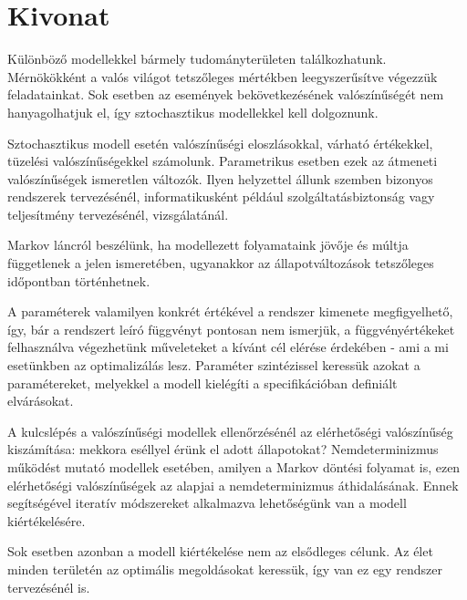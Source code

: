 \setcounter{page}{1}

\selecthungarian

\chapter*{Kivonat}

Különböző modellekkel bármely tudományterületen találkozhatunk.  Mérnökökként a valós világot tetszőleges mértékben leegyszerűsítve végezzük feladatainkat. Sok esetben az események bekövetkezésének valószínűségét nem hanyagolhatjuk el, így sztochasztikus modellekkel kell dolgoznunk.

Sztochasztikus modell esetén valószínűségi eloszlásokkal, várható értékekkel, tüzelési valószínűségekkel számolunk. Parametrikus esetben ezek az átmeneti valószínűségek ismeretlen változók. Ilyen helyzettel állunk szemben bizonyos rendszerek tervezésénél, informatikusként például szolgáltatásbiztonság vagy teljesítmény tervezésénél, vizsgálatánál.

Markov láncról beszélünk, ha modellezett folyamataink jövője és múltja függetlenek a jelen ismeretében, ugyanakkor az állapotváltozások tetszőleges időpontban történhetnek.

A paraméterek valamilyen konkrét értékével a rendszer kimenete megfigyelhető, így, bár a rendszert leíró függvényt pontosan nem ismerjük, a függvényértékeket felhasználva végezhetünk műveleteket a kívánt cél elérése érdekében - ami a mi esetünkben az optimalizálás lesz. Paraméter szintézissel keressük azokat a paramétereket, melyekkel a modell kielégíti a specifikációban definiált elvárásokat.

A kulcslépés a valószínűségi modellek ellenőrzésénél az elérhetőségi valószínűség kiszámítása: mekkora eséllyel érünk el adott állapotokat? Nemdeterminizmus működést mutató modellek esetében, amilyen a Markov döntési folyamat is, ezen elérhetőségi valószínűségek az alapjai a nemdeterminizmus áthidalásának. Ennek segítségével iteratív módszereket alkalmazva lehetőségünk van a modell kiértékelésére.

Sok esetben azonban a modell kiértékelése nem az elsődleges célunk. Az élet minden területén az optimális megoldásokat keressük, így van ez egy rendszer tervezésénél is. 

